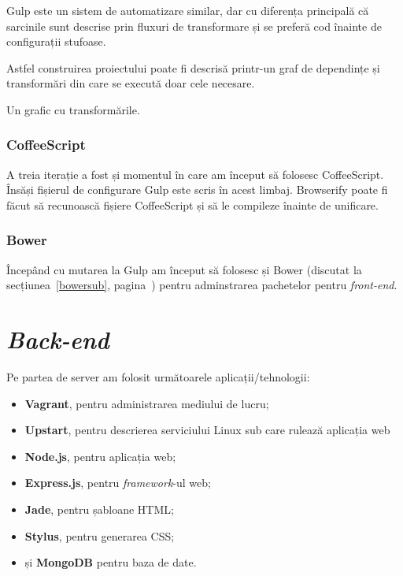 \documentclass[a4wide,12pt]{report}
\newcommand{\eng}[1]{\emph{#1}} %
\newcommand{\idee}[1]{{\color{red} #1}}
\begin{document}
Gulp este un sistem de automatizare similar, dar cu diferența principală că
sarcinile sunt descrise prin fluxuri de transformare și se preferă cod înainte
de configurații stufoase.

Astfel construirea proiectului poate fi descrisă printr-un graf de dependințe și
transformări din care se execută doar cele necesare.

\idee{Un grafic cu transformările.}

\subsubsection{CoffeeScript}

A treia iterație a fost și momentul în care am început să folosesc CoffeeScript.
Însăși fișierul de configurare Gulp este scris în acest limbaj. Browserify poate
fi făcut să recunoască fișiere CoffeeScript și să le compileze înainte de
unificare.

\subsubsection{Bower}

Începând cu mutarea la Gulp am început să folosesc și Bower (discutat la
secțiunea~\ref{bowersub}, pagina~\pageref{bowersub}) pentru adminstrarea
pachetelor pentru \eng{front-end}.

\section{\eng{Back-end}}

Pe partea de server am folosit următoarele aplicații/tehnologii:

\begin{itemize}

\item \textbf{Vagrant}, pentru administrarea mediului de lucru;

\item \textbf{Upstart}, pentru descrierea serviciului Linux sub care rulează
aplicația web

\item \textbf{Node.js}, pentru aplicația web;

\item \textbf{Express.js}, pentru \eng{framework}-ul web;

\item \textbf{Jade}, pentru șabloane HTML;

\item \textbf{Stylus}, pentru generarea CSS;

\item și \textbf{MongoDB} pentru baza de date.

\end{itemize}
\end{document}
